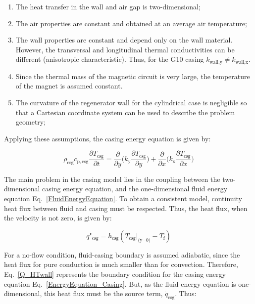 \documentclass[review,preprint,12pt]{elsarticle}
\begin{document}
\begin{enumerate}
\item  The heat transfer in the wall and air gap is two-dimensional;
\item  The air properties are constant and obtained at an average air temperature;
\item  The wall properties are constant and depend only on the wall material. However, the transversal and longitudinal thermal conductivities can be different (anisotropic characteristic). Thus, for the G10 casing $k_\textrm{wall,y} \neq k_\textrm{wall,x}$.
\item  Since the thermal mass of the magnetic circuit is very large, the temperature of the magnet is assumed constant.
\item The curvature of the regenerator wall for the cylindrical case is negligible so that a Cartesian coordinate system can be used to describe the problem geometry;
\end{enumerate}

Applying these assumptions, the casing energy equation is given by:


\begin{equation}
\rho_\textrm{csg} c_\mathrm{p,csg}\frac{\partial T_\textrm{csg}}{\partial t} = \frac{\partial}{\partial y}\Bigg(k_\mathrm{y}\frac{\partial T_\textrm{csg}}{\partial y}\Bigg) + \frac{\partial}{\partial x}\Bigg(k_\mathrm{x}\frac{\partial T_\textrm{csg}}{\partial x}\Bigg)
\label{EnergyEquation_Casing}
\end{equation}

The main problem in the casing model lies in the coupling between the two-dimensional casing energy equation, and the one-dimensional fluid energy equation Eq.~\eqref{FluidEnergyEquation}. To obtain a consistent model, continuity heat flux between fluid and casing must be respected. Thus, the heat flux, when the velocity is not zero, is given by:

\begin{equation}
q\textrm{"}_\textrm{csg} =  h_\textrm{csg}(T_\textrm{csg}|_\textrm{(y=0)} - T_\textrm{f})
\label{Q_HTwall}
\end{equation}

For a no-flow condition, fluid-casing boundary is assumed adiabatic, since the heat flux for pure conduction is much smaller than for convection. Therefore, Eq.~\eqref{Q_HTwall} represents the boundary condition for the casing energy equation Eq.~\eqref{EnergyEquation_Casing}. But, as the fluid energy equation is one-dimensional, this heat flux must be the source term, $\dot{q}_\textrm{csg}$. Thus:
\end{document}
